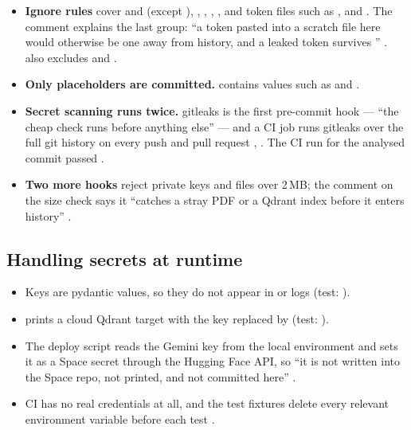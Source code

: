\begin{itemize}
  \item \textbf{Ignore rules} cover  and  (except ), , , , , and token files such as ,  and . The comment explains the last group: \enquote{a token pasted into a scratch file here would otherwise be one  away from history, and a leaked token survives } .  also excludes  and .
  \item \textbf{Only placeholders are committed.}  contains values such as  and .
  \item \textbf{Secret scanning runs twice.} gitleaks is the first pre-commit hook --- \enquote{the cheap check runs before anything else} --- and a CI job runs gitleaks over the full git history on every push and pull request , . The CI run for the analysed commit passed \tagV.
  \item \textbf{Two more hooks} reject private keys and files over 2\,MB; the comment on the size check says it \enquote{catches a stray PDF or a Qdrant index before it enters history} .
\end{itemize}

\subsection{Handling secrets at runtime}

\begin{itemize}
  \item Keys are pydantic  values, so they do not appear in  or logs (test: ).
  \item {} prints a cloud Qdrant target with the key replaced by \code{***} (test: ).
  \item The deploy script reads the Gemini key from the local environment and sets it as a Space secret through the Hugging Face API, so \enquote{it is not written into the Space repo, not printed, and not committed here} .
  \item CI has no real credentials at all, and the test fixtures delete every relevant environment variable before each test .
\end{itemize}

